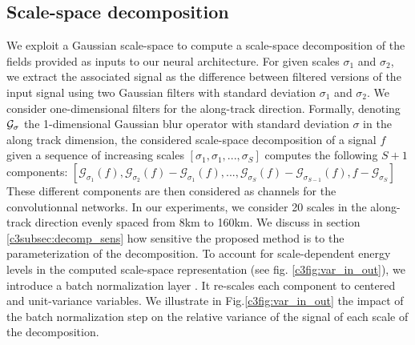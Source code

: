 \begin{bibunit}
 
\subsection{Scale-space decomposition}
\label{c3subsec:scale_decomp}


We exploit a Gaussian scale-space to compute a scale-space decomposition of the fields provided as inputs to our neural architecture. For given scales $\sigma_1$ and $\sigma_2$, we extract the associated signal as the difference between filtered versions of the input signal using two Gaussian filters with standard deviation $\sigma_1$ and $\sigma_2$. We consider one-dimensional filters for the along-track direction. Formally, denoting 
 $\cal{G_{\sigma}}$ the 1-dimensional Gaussian blur operator with standard deviation $\sigma$ in the along track dimension, the considered scale-space decomposition of a signal $f$ given a sequence of increasing scales $[\sigma_1, \sigma_1, ..., \sigma_S]$ computes the following $S+1$ components: $[\mathcal{G}_{\sigma_1}(f), \mathcal{G}_{\sigma_2}(f) - \mathcal{G}_{\sigma_1}(f),...,\mathcal{G}_{\sigma_S}(f) - \mathcal{G}_{\sigma_{S-1}}(f), f - \mathcal{G}_{\sigma_S}]$
These different components are then considered as channels for the convolutionnal networks. In our experiments, we consider 20 scales in the along-track direction evenly spaced from 8km to 160km. We discuss in section \ref{c3subsec:decomp_sens} how sensitive the proposed method is to the parameterization of the decomposition.
To account for scale-dependent energy levels in the computed scale-space representation (see fig. \ref{c3fig:var_in_out}), we introduce a batch normalization layer \cite{Ioffe_Szegedy_2015}. It re-scales each component to centered and unit-variance variables.
We illustrate in Fig.\ref{c3fig:var_in_out} the impact of the batch normalization step on the relative variance of the signal of each scale of the decomposition.


\end{bibunit}
